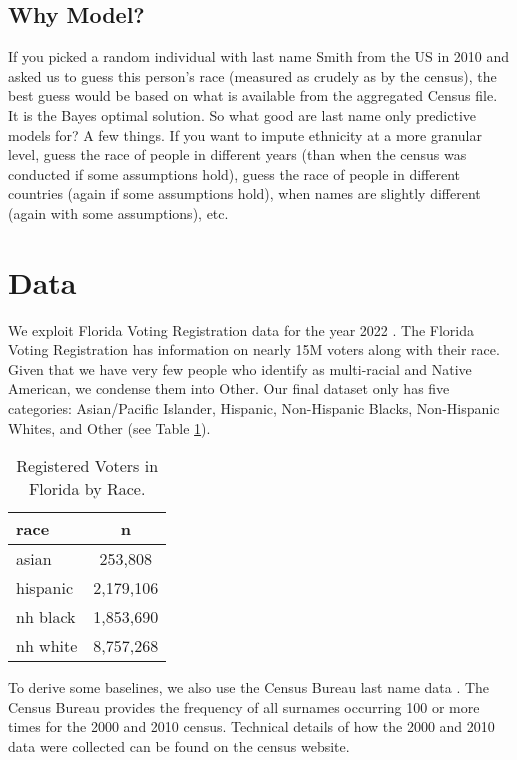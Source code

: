 \documentclass[12pt, letterpaper]{article}
\begin{document}
\subsection*{Why Model?} If you picked a random individual with last name Smith from the US in 2010 and asked us to guess this person's race (measured as crudely as by the census), the best guess would be based on what is available from the aggregated Census file. It is the Bayes optimal solution. So what good are last name only predictive models for? A few things. If you want to impute ethnicity at a more granular level, guess the race of people in different years (than when the census was conducted if some assumptions hold), guess the race of people in different countries (again if some assumptions hold), when names are slightly different (again with some assumptions), etc.

\section*{Data}
We exploit Florida Voting Registration data for the year 2022 \citep{sood_2017}. The Florida Voting Registration has information on nearly 15M voters along with their race. Given that we have very few people who identify as multi-racial and Native American, we condense them into Other. Our final dataset only has five categories: Asian/Pacific Islander, Hispanic, Non-Hispanic Blacks, Non-Hispanic Whites, and Other (see Table \ref{table:fl_data}). 

\begin{table}[h!]
\centering
\caption{Registered Voters in Florida by Race.}
\begin{tabular}{ l c }
\hline    
race & n \\
\hline
asian & 253,808 \\
hispanic & 2,179,106 \\
nh black & 1,853,690 \\
nh white & 8,757,268 \\
\hline
\end{tabular}
\label{table:fl_data}
\end{table}

To derive some baselines, we also use the Census Bureau last name data \citep{census2010}. The Census Bureau provides the frequency of all surnames occurring 100 or more times for the 2000 and 2010 census. Technical details of how the 2000 and 2010 data were collected can be found on the census website. 
\end{document}
